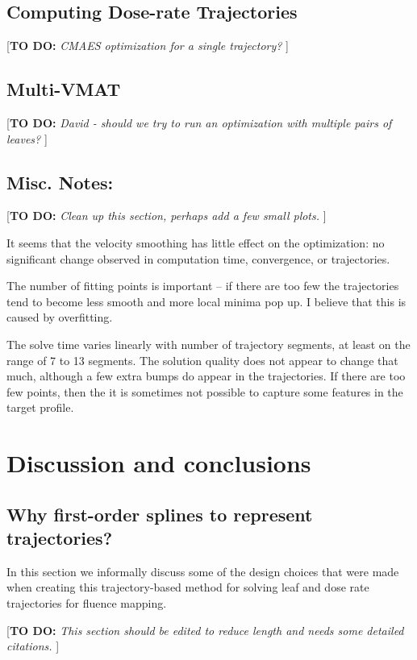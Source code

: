 \documentclass[12pt]{article}
\newcommand{\todo}[1]{{\color{lightblue}\par {[{\bf TO DO: } {\em #1}} ] \\    }}
\begin{document}
\subsection{Computing Dose-rate Trajectories}

\todo{CMAES optimization for a single trajectory?}

\subsection{Multi-VMAT}

\todo{David - should we try to run an optimization with multiple pairs of leaves?}

\subsection{Misc. Notes:}

\todo{Clean up this section, perhaps add a few small plots.}

It seems that the velocity smoothing has little effect on the optimization: no significant
change observed in computation time, convergence, or trajectories.

The number of fitting points is important -- if there are too few the trajectories tend to
become less smooth and more local minima pop up. I believe that this is caused by overfitting.

The solve time varies linearly with number of trajectory segments, at least on the range of 7 to 13 segments.
The solution quality does not appear to change that much, although a few extra bumps do appear in the trajectories.
If there are too few points, then the it is sometimes not possible to capture some features in the target profile.

\section{Discussion and conclusions}


\subsection{Why first-order splines to represent trajectories?}
\label{sec:WhyUseLinearSplines}

In this section we informally discuss some of the design choices that were made when creating this
trajectory-based method for solving leaf and dose rate trajectories for fluence mapping.

\todo{This section should be edited to reduce length and needs some detailed citations.}
\end{document}
